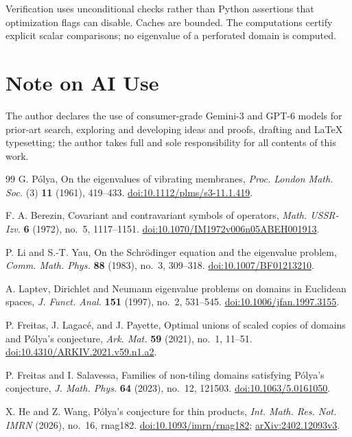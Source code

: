 \documentclass[11pt,reqno]{amsart}
\numberwithin{equation}{section}
\begin{document}
Verification uses unconditional checks rather than
Python assertions that optimization flags can disable.
Caches are bounded. The computations certify explicit scalar
comparisons; no eigenvalue of a perforated domain is computed.


\section*{Note on AI Use}
The author declares the use of consumer-grade Gemini-3 and GPT-6 models for prior-art search, exploring and developing ideas and proofs, drafting and LaTeX typesetting; the author takes full and sole responsibility for all contents of this work.

\begin{thebibliography}{99}
G. P\'olya,
On the eigenvalues of vibrating membranes,
\emph{Proc. London Math. Soc.} (3) \textbf{11} (1961), 419--433.
\href{https://doi.org/10.1112/plms/s3-11.1.419}{doi:10.1112/plms/s3-11.1.419}.

F. A. Berezin,
Covariant and contravariant symbols of operators,
\emph{Math. USSR-Izv.} \textbf{6} (1972), no.~5, 1117--1151.
\href{https://doi.org/10.1070/IM1972v006n05ABEH001913}{doi:10.1070/IM1972v006n05ABEH001913}.

P. Li and S.-T. Yau,
On the Schr\"odinger equation and the eigenvalue problem,
\emph{Comm. Math. Phys.} \textbf{88} (1983), no.~3, 309--318.
\href{https://doi.org/10.1007/BF01213210}{doi:10.1007/BF01213210}.

A. Laptev,
Dirichlet and Neumann eigenvalue problems on domains in Euclidean spaces,
\emph{J. Funct. Anal.} \textbf{151} (1997), no.~2, 531--545.
\href{https://doi.org/10.1006/jfan.1997.3155}{doi:10.1006/jfan.1997.3155}.

P. Freitas, J. Lagac\'e, and J. Payette,
Optimal unions of scaled copies of domains and P\'olya's conjecture,
\emph{Ark. Mat.} \textbf{59} (2021), no.~1, 11--51.
\href{https://doi.org/10.4310/ARKIV.2021.v59.n1.a2}{doi:10.4310/ARKIV.2021.v59.n1.a2}.

P. Freitas and I. Salavessa,
Families of non-tiling domains satisfying P\'olya's conjecture,
\emph{J. Math. Phys.} \textbf{64} (2023), no.~12, 121503.
\href{https://doi.org/10.1063/5.0161050}{doi:10.1063/5.0161050}.

X. He and Z. Wang,
P\'olya's conjecture for thin products,
\emph{Int. Math. Res. Not. IMRN} (2026), no.~16, rnag182.
\href{https://doi.org/10.1093/imrn/rnag182}{doi:10.1093/imrn/rnag182};
\href{https://arxiv.org/abs/2402.12093v3}{arXiv:2402.12093v3}.


\end{thebibliography}
\end{document}
